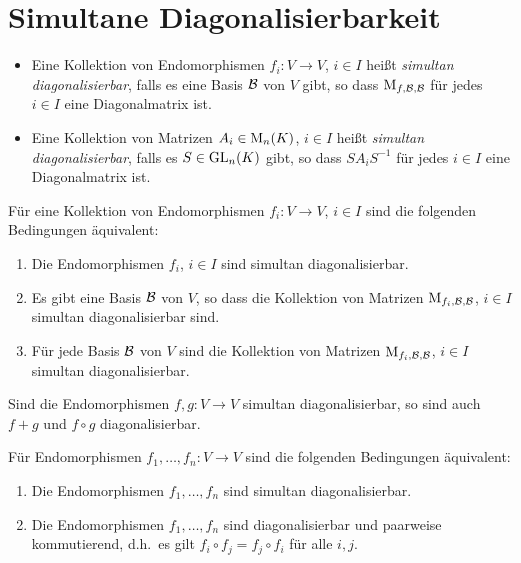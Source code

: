 \section{Simultane Diagonalisierbarkeit}

\begin{definition}
  \leavevmode
  \begin{itemize}
    \item
      Eine Kollektion von Endomorphismen $f_i \colon V \to V$, $i \in I$ heißt \emph{simultan diagonalisierbar}, falls es eine Basis $\mathcal{B}$ von $V$ gibt, so dass $\operatorname{M}_{f, \mathcal{B}, \mathcal{B}}$ für jedes $i \in I$ eine Diagonalmatrix ist.
    \item
      Eine Kollektion von Matrizen $A_i \in \operatorname{M}_{n}(K)$, $i \in I$ heißt \emph{simultan diagonalisierbar}, falls es $S \in \operatorname{GL}_{n}(K)$ gibt, so dass $S A_i S^{-1}$ für jedes $i \in I$ eine Diagonalmatrix ist.
  \end{itemize}
\end{definition}

\begin{lemma}
  Für eine Kollektion von Endomorphismen $f_i \colon V \to V$, $i \in I$ sind die folgenden Bedingungen äquivalent:
  \begin{enumerate}
    \item
      Die Endomorphismen $f_i$, $i \in I$ sind simultan diagonalisierbar.
    \item
      Es gibt eine Basis $\mathcal{B}$ von $V$, so dass die Kollektion von Matrizen $\operatorname{M}_{f_i, \mathcal{B}, \mathcal{B}}$, $i \in I$ simultan diagonalisierbar sind.
    \item
      Für jede Basis $\mathcal{B}$ von $V$ sind die Kollektion von Matrizen $\operatorname{M}_{f_i, \mathcal{B}, \mathcal{B}}$, $i \in I$ simultan diagonalisierbar.
  \end{enumerate}
\end{lemma}

\begin{example}
  Sind die Endomorphismen $f, g \colon V \to V$ simultan diagonalisierbar, so sind auch $f + g$ und $f \circ g$ diagonalisierbar.
\end{example}

\begin{proposition}
  Für Endomorphismen $f_1, \dotsc, f_n \colon V \to V$ sind die folgenden Bedingungen äquivalent:
  \begin{enumerate}
    \item
      Die Endomorphismen $f_1, \dotsc, f_n$ sind simultan diagonalisierbar.
    \item
      Die Endomorphismen $f_1, \dotsc, f_n$ sind diagonalisierbar und paarweise kommutierend, d.h.\ es gilt $f_i \circ  f_j = f_j \circ f_i$ für alle $i, j$.
  \end{enumerate}
\end{proposition}